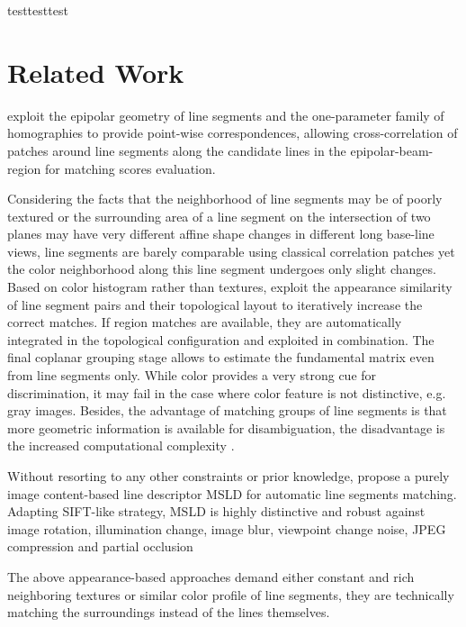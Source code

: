 testtesttest
\cite{SAE2014}


\section{Related Work}

\citeauthor{SchmidJun1997} exploit the epipolar geometry of line segments and the one-parameter family of homographies to provide point-wise correspondences, allowing cross-correlation of patches around line segments along the candidate lines in the epipolar-beam-region for matching scores evaluation.

Considering the facts that the neighborhood of line segments may be of poorly textured or the surrounding area of a line segment on the intersection of two planes may have very different affine shape changes in different long base-line views, line segments are barely comparable using classical correlation patches yet the color neighborhood along this line segment undergoes only slight changes. %
Based on color histogram rather than textures, \citeauthor{BayJun2005} exploit the appearance similarity of line segment pairs and their topological layout to iteratively increase the correct matches. If region matches are available, they are automatically integrated in the topological configuration and exploited in combination. The final coplanar grouping stage allows to estimate the fundamental matrix even from line segments only. While color provides a very strong cue for discrimination, it may fail in the case where color feature is not distinctive, e.g. gray images. Besides, the advantage of matching groups of line segments is that more geometric information is available for disambiguation, the disadvantage is the increased computational complexity \cite{SchmidJun1997}.


Without resorting to any other constraints or prior knowledge, \citeauthor{WangMay2009} propose a purely image content-based line descriptor MSLD for automatic line segments matching. Adapting SIFT-like strategy, MSLD is highly distinctive and robust against image rotation, illumination change, image blur, viewpoint change noise, JPEG compression and partial occlusion \cite{WangMay2009}

The above appearance-based approaches demand either constant and rich neighboring textures or similar color profile of line segments, they are technically matching the surroundings instead of the lines themselves.

